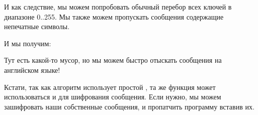 И как следствие, мы можем попробовать обычный перебор всех ключей в диапазоне 0..255.
Мы также можем пропускать сообщения содержащие непечатные символы.



И мы получим:



Тут есть какой-то мусор, но мы можем быстро отыскать сообщения на английском языке!

Кстати, так как алгоритм использует простой \XOR, та же функция может использоваться и для шифрования
сообщения.
Если нужно, мы можем зашифровать наши собственные сообщения, и пропатчить программу вставив их.

